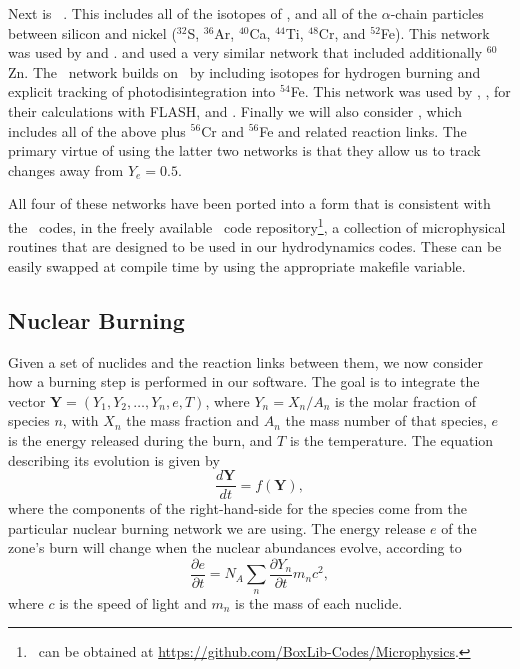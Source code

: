 \documentclass[12pt]{article}
\begin{document}
Next is \aproxthirteen\ \citep{timmes:1999,timmes:2000}. This includes
all of the isotopes of \isoseven, and all of the $\alpha$-chain particles between
silicon and nickel (${}^{32}$S, ${}^{36}$Ar, ${}^{40}$Ca, ${}^{44}$Ti, ${}^{48}$Cr,
and ${}^{52}$Fe). This network was used by \citet{hawley:2012} and \citet{raskin:2010}.
\citet{loren-aguilar:2010} and \citet{garcia-senz:2013} used a very similar network
that included additionally ${}^{60}$Zn. The \aproxnineteen\ network \citep{timmes:1999}
builds on \aproxthirteen\ by including isotopes for hydrogen burning and explicit
tracking of photodisintegration into ${}^{54}$Fe. This network was used by
\citet{kushnir:2013}, \citet{kushnir:2014}, \citet{rosswog:2009} for their
calculations with FLASH, and \citet{papish:2015}. Finally we will also
consider \aproxtwentyone, which includes all of the above plus ${}^{56}$Cr
and ${}^{56}$Fe and related reaction links. The primary virtue of using
the latter two networks is that they allow us to track changes away from
$Y_e = 0.5$.

All four of these networks have been ported into a form that is consistent
with the \boxlib\ codes, in the freely available \microphysics\ code
repository\footnote{\microphysics\ can be obtained at \url{https://github.com/BoxLib-Codes/Microphysics}.},
a collection of microphysical routines that are designed to be used in our
hydrodynamics codes. These can be easily swapped at compile time by using the 
appropriate makefile variable.



\subsection{Nuclear Burning}
\label{sec:burning}

Given a set of nuclides and the reaction links between them, we now consider
how a burning step is performed in our software. The goal is to integrate the
vector ${\bm{Y}} = (Y_1, Y_2, \ldots, Y_n, e, T)$, where $Y_{n} = X_{n} / A_{n}$
is the molar fraction of species $n$, with $X_n$ the mass fraction and $A_n$ the
mass number of that species, $e$ is the energy released during the burn, and
$T$ is the temperature. The equation describing its evolution is given by
\begin{equation}
  \frac{d\bm{Y}}{dt} = f(\mathbf{Y}),
\end{equation}
where the components of the right-hand-side for the species come from the particular
nuclear burning network we are using. The energy release $e$ of the zone's burn
will change when the nuclear abundances evolve, according to
\begin{equation}
  \frac{\partial e}{\partial t} = N_A \sum_{n} \frac{\partial Y_{n}}{\partial t} m_{n} c^2,
\end{equation}
where $c$ is the speed of light and $m_n$ is the mass of each nuclide.
\end{document}
